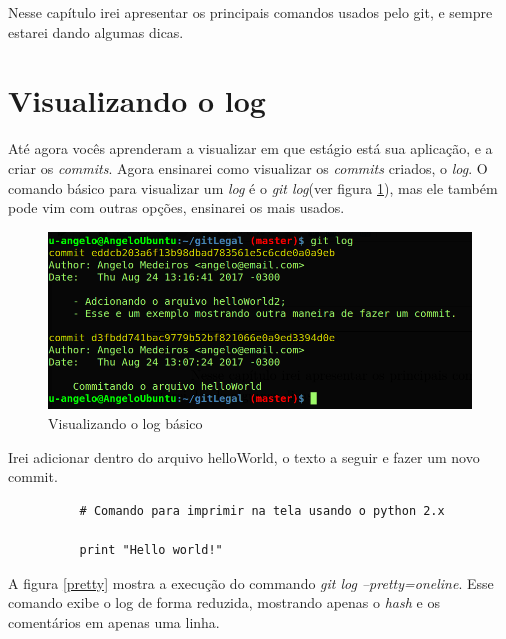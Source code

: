\documentclass[12pt,openright,oneside,a4paper,english,brazil]{abntex2}
\begin{document}
Nesse capítulo irei apresentar os principais comandos usados pelo git, e sempre estarei dando algumas dicas.

\section{Visualizando o log}

Até agora vocês aprenderam a visualizar em que estágio está sua aplicação, e a criar os \textit{commits}. Agora ensinarei como visualizar os \textit{commits} criados, o \textit{log}. O comando básico para visualizar um \textit{log} é o \textit{git log}(ver figura \ref{gitlog}), mas ele também pode vim com outras opções, ensinarei os mais usados.

\begin{figure}[h]
	\caption{\label{gitlog}Visualizando o log básico}
	\begin{center}
		\includegraphics[width=1\linewidth]{gitlog}
	\end{center}
\end{figure}

Irei adicionar dentro do arquivo helloWorld, o texto a seguir e fazer um novo commit. 

\begin{verbatim}
          # Comando para imprimir na tela usando o python 2.x 
                   
          print "Hello world!"
\end{verbatim}

A figura \ref{pretty} mostra a execução do commando \textit{git log --pretty=oneline}. Esse comando exibe o log de forma reduzida, mostrando apenas o \textit{hash} e os comentários em apenas uma linha.
\end{document}
